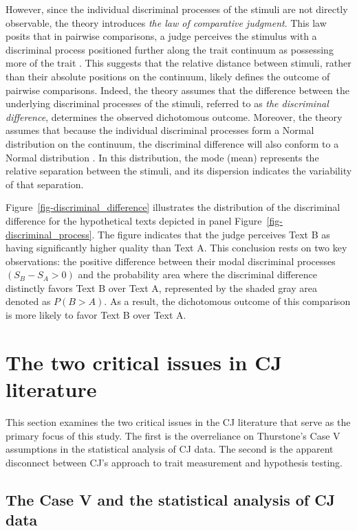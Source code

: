 \documentclass[
  authoryear,
  preprint,
  1p]{elsarticle}
\begin{document}
However, since the individual discriminal processes of the stimuli are
not directly observable, the theory introduces \emph{the law of
comparative judgment}. This law posits that in pairwise comparisons, a
judge perceives the stimulus with a discriminal process positioned
further along the trait continuum as possessing more of the trait
\citep[pp.~251]{Bramley_2008}. This suggests that the relative distance
between stimuli, rather than their absolute positions on the continuum,
likely defines the outcome of pairwise comparisons. Indeed, the theory
assumes that the difference between the underlying discriminal processes
of the stimuli, referred to as \emph{the discriminal difference},
determines the observed dichotomous outcome. Moreover, the theory
assumes that because the individual discriminal processes form a Normal
distribution on the continuum, the discriminal difference will also
conform to a Normal distribution \citep{Andrich_1978}. In this
distribution, the mode (mean) represents the relative separation between
the stimuli, and its dispersion indicates the variability of that
separation.

Figure~\ref{fig-discriminal_difference} illustrates the distribution of
the discriminal difference for the hypothetical texts depicted in panel
Figure~\ref{fig-discriminal_process}. The figure indicates that the
judge perceives Text B as having significantly higher quality than Text
A. This conclusion rests on two key observations: the positive
difference between their modal discriminal processes
\((S_{B} - S_{A} > 0)\) and the probability area where the discriminal
difference distinctly favors Text B over Text A, represented by the
shaded gray area denoted as \(P(B > A)\). As a result, the dichotomous
outcome of this comparison is more likely to favor Text B over Text A.

\section{The two critical issues in CJ
literature}\label{sec-theory-issues}

This section examines the two critical issues in the CJ literature that
serve as the primary focus of this study. The first is the overreliance
on Thurstone's Case V assumptions in the statistical analysis of CJ
data. The second is the apparent disconnect between CJ's approach to
trait measurement and hypothesis testing.

\subsection{The Case V and the statistical analysis of CJ
data}\label{sec-theory-issue1}
\end{document}
